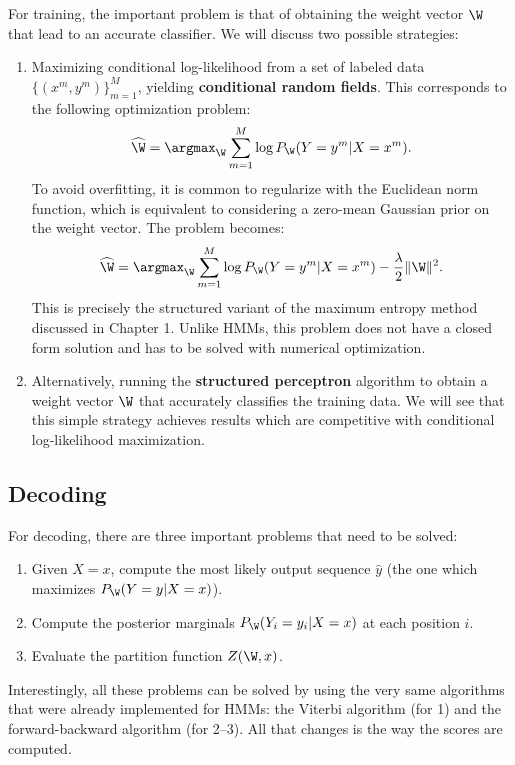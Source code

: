 For training, 
the important problem is that of obtaining the weight vector $\W$ that lead to an accurate 
classifier. 
We will discuss two possible strategies:
\begin{enumerate}
\item Maximizing conditional log-likelihood from a set of labeled data $\{(x^m,y^m)\}_{m=1}^M$, yielding \textbf{conditional random fields}. This corresponds to the following optimization problem:
\begin{equation}
\widehat{\W} = \argmax_{\W} \sum_{m=1}^M \log P_{\W}(Y=y^m | X=x^m).
\end{equation}
To avoid overfitting, it is common to regularize with the Euclidean norm function, 
which is equivalent to considering a zero-mean Gaussian prior on the weight vector.
The problem becomes:
\begin{equation}
\widehat{\W} = \argmax_{\W} \sum_{m=1}^M \log P_{\W}(Y=y^m | X=x^m) - \frac{\lambda}{2} \|\W\|^2.
\end{equation}
This is precisely the structured variant of the maximum entropy 
method discussed in Chapter 1.
Unlike HMMs, this problem does not have a closed form solution 
and has to be solved with numerical optimization. 
\item Alternatively, running the \textbf{structured perceptron} algorithm 
to obtain a weight vector $\W$ that accurately
classifies the training data. 
We will see that this simple strategy achieves results which are competitive 
with conditional log-likelihood maximization.
\end{enumerate}

\subsection{Decoding}

For decoding,  
there are three important problems that need to be solved: 
\begin{enumerate}
\item Given $X=x$, compute the most likely output sequence $\widehat{y}$ (the one which maximizes $P_{\W}(Y=y|X=x)$). 
\item Compute the posterior marginals $P_{\W}(Y_i=y_i|X=x)$ at each position $i$.
\item Evaluate the partition function $Z(\W,x)$. 
\end{enumerate}
Interestingly, all these problems can be solved by using the very same
algorithms that were 
already implemented for HMMs: the Viterbi algorithm (for 1) and the forward-backward algorithm (for 2--3). All that changes is the way the scores are computed. 


